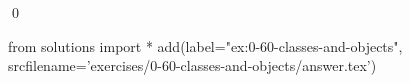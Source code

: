 
\begin{ex}
  \label{ex:0-60-classes-and-objects}
  
  \qed
\end{ex}
\begin{python0}
from solutions import *
add(label="ex:0-60-classes-and-objects",
    srcfilename='exercises/0-60-classes-and-objects/answer.tex')
\end{python0}
